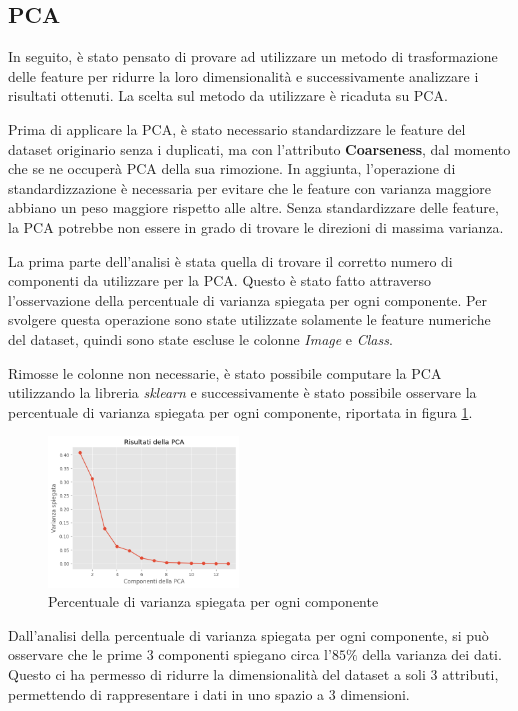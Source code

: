 \subsection{PCA} \label{sec:pca}
In seguito, è stato pensato di provare ad utilizzare un metodo di trasformazione
delle feature per ridurre la loro dimensionalità e successivamente analizzare i
risultati ottenuti. La scelta sul metodo da utilizzare è ricaduta su PCA.

Prima di applicare la PCA, è stato necessario standardizzare le feature del dataset
originario senza i duplicati, ma con l'attributo \textbf{Coarseness}, dal momento
che se ne occuperà PCA della sua rimozione. In aggiunta, l'operazione di 
standardizzazione è necessaria per evitare che le feature con varianza maggiore 
abbiano un peso maggiore rispetto alle altre. Senza standardizzare delle feature, 
la PCA potrebbe non essere in grado di trovare le direzioni di massima varianza.

La prima parte dell'analisi è stata quella di trovare il corretto numero di
componenti da utilizzare per la PCA. Questo è stato fatto attraverso
l'osservazione della percentuale di varianza spiegata per ogni componente. Per
svolgere questa operazione sono state utilizzate solamente le feature numeriche
del dataset, quindi sono state escluse le colonne \textit{Image} e \textit{Class}.

Rimosse le colonne non necessarie, è stato possibile computare la PCA utilizzando
la libreria \textit{sklearn} e successivamente è stato possibile osservare la
percentuale di varianza spiegata per ogni componente, riportata in figura \ref{fig:pca}.

\begin{figure}[!ht]
      \centering
      \includegraphics[width=0.45\textwidth]{img/analisi/pcaVarianza.png}
      \caption{Percentuale di varianza spiegata per ogni componente}
      \label{fig:pca}
\end{figure}

Dall'analisi della percentuale di varianza spiegata per ogni componente, si può
osservare che le prime $3$ componenti spiegano circa l'$85\%$ della varianza
dei dati. Questo ci ha permesso di ridurre la dimensionalità del dataset a soli
$3$ attributi, permettendo di rappresentare i dati in uno spazio a $3$ dimensioni.


